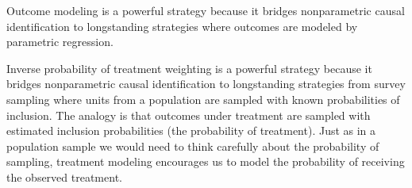 \documentclass[
  letterpaper,
  DIV=11,
  numbers=noendperiod]{scrartcl}
\begin{document}
Outcome modeling is a powerful strategy because it bridges nonparametric
causal identification to longstanding strategies where outcomes are
modeled by parametric regression.

Inverse probability of treatment weighting is a powerful strategy
because it bridges nonparametric causal identification to longstanding
strategies from survey sampling where units from a population are
sampled with known probabilities of inclusion. The analogy is that
outcomes under treatment are sampled with estimated inclusion
probabilities (the probability of treatment). Just as in a population
sample we would need to think carefully about the probability of
sampling, treatment modeling encourages us to model the probability of
receiving the observed treatment.
\end{document}
